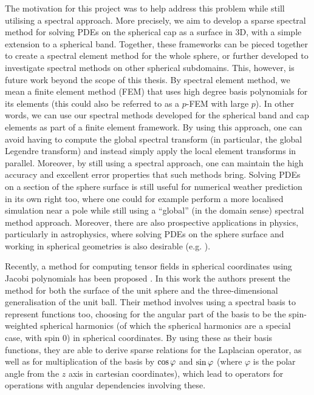 The motivation for this project was to help address this problem while still utilising a spectral approach. More precisely, we aim to develop a sparse spectral method for solving PDEs on the spherical cap as a surface in 3D, with a simple extension to a spherical band. Together, these frameworks can be pieced together to create a spectral element method for the whole sphere, or further developed to investigate spectral methods on other spherical subdomains. This, however, is future work beyond the scope of this thesis. By spectral element method, we mean a finite element method (FEM) that uses high degree basis polynomials for its elements (this could also be referred to as a $p$-FEM with large $p$). In other words, we can use our spectral methods developed for the spherical band and cap elements as part of a finite element framework. By using this approach, one can avoid having to compute the global spectral transform (in particular, the global Legendre transform) and instead simply apply the local element transforms in parallel. Moreover, by still using a spectral approach, one can maintain the high accuracy and excellent error properties that such methods bring. Solving PDEs on a section of the sphere surface is still useful for numerical weather prediction in its own right too, where one could for example perform a more localised simulation near a pole while still using a \enquote{global} (in the domain sense) spectral method approach. Moreover, there are also prospective applications in physics, particularly in astrophysics, where solving PDEs on the sphere surface and working in spherical geometries is also desirable (e.g. \cite{vasil2019tensor, reinecke2013libsharp, beyer2014numerical, varshalovich1988quantum, slevinsky2018spectral, rubinstein2015scalar}).

Recently, a method for computing tensor fields in spherical coordinates using Jacobi polynomials has been proposed \cite{vasil2019tensor}. In this work the authors present the method for both the surface of the unit sphere and the three-dimensional generalisation of the unit ball. Their method involves using a spectral basis to represent functions too, choosing for the angular part of the basis to be the spin-weighted spherical harmonics (of which the spherical harmonics are a special case, with spin $0$) in spherical coordinates. By using these as their basis functions, they are able to derive sparse relations for the Laplacian operator, as well as for multiplication of the basis by $\cos\varphi$ and $\sin\varphi$ (where $\varphi$ is the polar angle from the $z$ axis in cartesian coordinates), which lead to operators for operations with angular dependencies involving these. 


